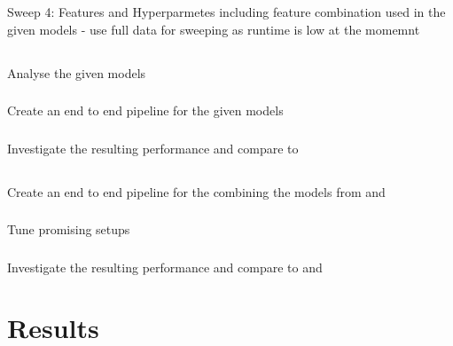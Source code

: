 \documentclass[a4paper]{article}
\begin{document}
    Sweep 4: Features and Hyperparmetes including feature combination used in the given models
    - use full data for sweeping as runtime is low at the momemnt


    \subsection*{}
    \subsubsection*{} Analyse the given models
    \subsubsection*{} Create an end to end pipeline for the given models
    \subsubsection*{} Investigate the resulting performance and compare to 

    \subsection*{}
    \subsubsection*{} Create an end to end pipeline for the combining the models from  and 
    \subsubsection*{} Tune promising setups
    \subsubsection*{} Investigate the resulting performance and compare to  and 



    \section{Results}\label{sec:results}
    \subsection*{}
\end{document}
